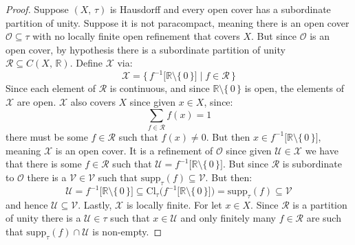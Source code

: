 \documentclass{article}
\theoremstyle{plain}
\theoremstyle{normal}
\begin{document}
        \begin{proof}
            Suppose $(X,\,\tau)$ is Hausdorff and every open cover has a
            subordinate partition of unity. Suppose it is not paracompact,
            meaning there is an open cover $\mathcal{O}\subseteq\tau$ with no
            locally finite open refinement that covers $X$. But since
            $\mathcal{O}$ is an open cover, by hypothesis there is a
            subordinate partition of unity
            $\mathcal{R}\subseteq{C}(X,\,\mathbb{R})$. Define $\mathcal{X}$ via:
            \begin{equation}
                \mathcal{X}=
                \big\{\,f^{-1}\big[\mathbb{R}\setminus\{\,0\,\}\big]
                    \;|\;f\in\mathcal{R}\,\}
            \end{equation}
            Since each element of $\mathcal{R}$ is continuous, and since
            $\mathbb{R}\setminus\{\,0\,\}$ is open, the elements of
            $\mathcal{X}$ are open. $\mathcal{X}$ also covers $X$ since given
            $x\in{X}$, since:
            \begin{equation}
                \sum_{f\in\mathcal{R}}f(x)=1
            \end{equation}
            there must be some $f\in\mathcal{R}$ such that $f(x)\ne{0}$. But
            then $x\in{f}^{-1}\big[\mathbb{R}\setminus\{\,0\,\}\big]$, meaning
            $\mathcal{X}$ is an open cover. It is a refinement of $\mathcal{O}$
            since given $\mathcal{U}\in\mathcal{X}$ we have that there is some
            $f\in\mathcal{R}$ such that
            $\mathcal{U}=f^{-1}\big[\mathbb{R}\setminus\{\,0\,\}\big]$. But
            since $\mathcal{R}$ is subordinate to $\mathcal{O}$ there is a
            $\mathcal{V}\in\mathcal{V}$ such that
            $\textrm{supp}_{\tau}(f)\subseteq\mathcal{V}$. But then:
            \begin{equation}
                \mathcal{U}=f^{-1}\big[\mathbb{R}\setminus\{\,0\,\}\big]
                \subseteq\textrm{Cl}_{\tau}\Big(
                    f^{-1}\big[\mathbb{R}\setminus\{\,0\,\}\big]\Big)
                =\textrm{supp}_{\tau}(f)
                \subseteq\mathcal{V}
            \end{equation}
            and hence $\mathcal{U}\subseteq\mathcal{V}$. Lastly, $\mathcal{X}$
            is locally finite. For let $x\in{X}$. Since $\mathcal{R}$ is a
            partition of unity there is a $\mathcal{U}\in\tau$ such that
            $x\in\mathcal{U}$ and only finitely many $f\in\mathcal{R}$ are
            such that $\textrm{supp}_{\tau}(f)\cap\mathcal{U}$ is non-empty.

\end{proof}
\end{document}
